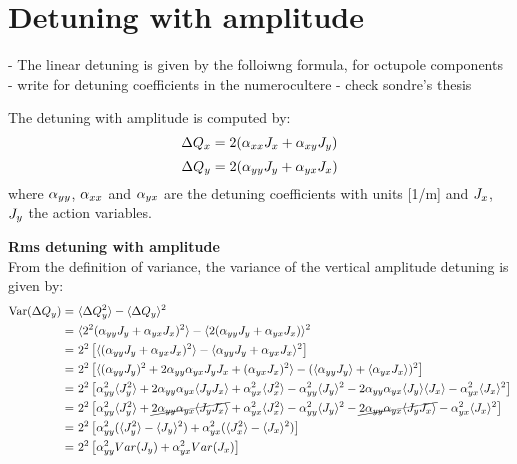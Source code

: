 


\section{Detuning with amplitude}\label{app:detuning_with_amplitude}
- The linear detuning is given by the folloiwng formula, for octupole components
- write for detuning coefficients in the numerocultere
- check sondre's thesis

The detuning with amplitude is computed by:
\begin{equation}\label{eq:x_amplDetuning}
    \Delta Q_x = 2({\alpha_{xx}} {J_x} + \alpha_{xy} {J_y})
\end{equation}
\begin{equation}\label{eq:y_amplDetuning}
    \Delta Q_y = 2({\alpha_{yy}} {J_y} + \alpha_{yx} {J_x})
\end{equation}
where ${\alpha_{yy}}$, ${\alpha_{xx}}$ and ${\alpha_{yx}}$ are the detuning coefficients with units [1/m] and ${J_x}$, ${J_y}$ the action variables.


\normalsize{\textbf{Rms detuning with amplitude}}\\
From the definition of variance, the variance of the vertical amplitude detuning is given by:
\begin{equation}\label{eq:var_amplDetuning}
    \begin{split}
        \mathrm{Var}(\Delta Q_y) = &~\langle \Delta Q_y ^2 \rangle - \langle \Delta Q_y \rangle ^2 \\
        = &~\langle 2^2 (\alpha_{yy} J_y + \alpha_{yx}J_x)^2 \rangle - \langle 2(\alpha_{yy}J_y + \alpha_{yx}J_x) \rangle^2 \\
        = &~2^2 \left [ \langle (\alpha_{yy} J_y + \alpha_{yx}J_x)^2 \rangle - \langle \alpha_{yy}J_y + \alpha_{yx}J_x \rangle^2 \right ] \\
         = &~2^2 \left [  \langle (\alpha_{yy} J_y)^2 + 2\alpha_{yy}\alpha_{yx}J_yJ_x + (\alpha_{yx} J_x)^2  \rangle - (\langle \alpha_{yy}J_y \rangle + \langle \alpha_{yx}J_x \rangle )^2 \right ]\\
         =&~2^2\left [ \alpha_{yy}^2 \langle J_y^2 \rangle + 2\alpha_{yy}\alpha_{yx} \langle J_yJ_x \rangle + \alpha_{yx}^2 \langle J_x^2 \rangle -\alpha_{yy}^2  \langle J_y \rangle^2 - 2\alpha_{yy} \alpha_{yx} \langle J_y \rangle \langle J_x \rangle - \alpha_{yx} ^2 \langle J_x \rangle^2 \right ]\\
         =&~2^2\left [ \alpha_{yy}^2 \langle J_y^2 \rangle + \cancel{2\alpha_{yy}\alpha_{yx} \langle J_yJ_x \rangle} + \alpha_{yx}^2 \langle J_x^2 \rangle -\alpha_{yy}^2  \langle J_y \rangle^2 - \cancel{2\alpha_{yy} \alpha_{yx} \langle J_y J_x \rangle} - \alpha_{yx} ^2 \langle J_x \rangle^2 \right ]\\
         =&~2^2\left [ \alpha_{yy}^2(\langle J_y^2\rangle - \langle J_y \rangle^2 ) + \alpha_{yx}^2(\langle J_x^2\rangle - \langle J_x \rangle^2 ) \right ]\\
         =&~2^2\left [ \alpha_{yy}^2 Var(J_y) + \alpha_{yx}^2 Var(J_x) \right ]
    \end{split}
\end{equation}

